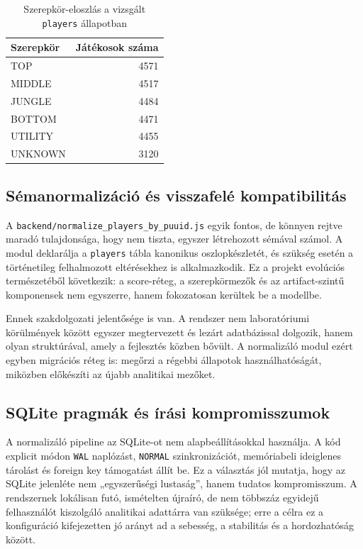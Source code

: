 \begin{table}[H]
\centering
\caption{Szerepkör-eloszlás a vizsgált \texttt{players} állapotban}
\begin{tabular}{lr}
\toprule
\textbf{Szerepkör} & \textbf{Játékosok száma} \\
\midrule
TOP & 4571 \\
MIDDLE & 4517 \\
JUNGLE & 4484 \\
BOTTOM & 4471 \\
UTILITY & 4455 \\
UNKNOWN & 3120 \\
\bottomrule
\end{tabular}
\end{table}

\subsection{Sémanormalizáció és visszafelé kompatibilitás}

A \texttt{backend/normalize\_players\_by\_puuid.js} egyik fontos, de könnyen rejtve maradó tulajdonsága, hogy nem tiszta, egyszer létrehozott sémával számol. A modul deklarálja a \texttt{players} tábla kanonikus oszlopkészletét, és szükség esetén a történetileg felhalmozott eltérésekhez is alkalmazkodik. Ez a projekt evolúciós természetéből következik: a score-réteg, a szerepkörmezők és az artifact-szintű komponensek nem egyszerre, hanem fokozatosan kerültek be a modellbe.

Ennek szakdolgozati jelentősége is van. A rendszer nem laboratóriumi körülmények között egyszer megtervezett és lezárt adatbázissal dolgozik, hanem olyan struktúrával, amely a fejlesztés közben bővült. A normalizáló modul ezért egyben migrációs réteg is: megőrzi a régebbi állapotok használhatóságát, miközben előkészíti az újabb analitikai mezőket.

\subsection{SQLite pragmák és írási kompromisszumok}

A normalizáló pipeline az SQLite-ot nem alapbeállításokkal használja. A kód explicit módon \texttt{WAL} naplózást, \texttt{NORMAL} szinkronizációt, memóriabeli ideiglenes tárolást és foreign key támogatást állít be. Ez a választás jól mutatja, hogy az SQLite jelenléte nem „egyszerűségi lustaság”, hanem tudatos kompromisszum. A rendszernek lokálisan futó, ismételten újraíró, de nem többszáz egyidejű felhasználót kiszolgáló analitikai adattárra van szüksége; erre a célra ez a konfiguráció kifejezetten jó arányt ad a sebesség, a stabilitás és a hordozhatóság között.

